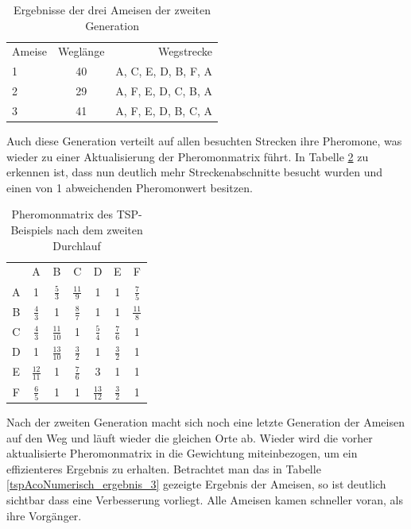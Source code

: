 	\begin{table}
		\centering
		\footnotesize
		\begin{tabular}{l c r}
			Ameise & Weglänge & Wegstrecke \\
			1 & 40 & A, C, E, D, B, F, A\\
			2 & 29 & A, F, E, D, C, B, A\\ 
			3 & 41 & A, F, E, D, B, C, A\\
		\end{tabular}
		\caption{Ergebnisse der drei Ameisen der zweiten Generation}
		\label{tspAcoNumerisch_ergebnis_2}
	\end{table}
	
	Auch diese Generation verteilt auf allen besuchten Strecken ihre Pheromone, was wieder zu einer Aktualisierung der Pheromonmatrix führt. In Tabelle \ref{tspAcoNumerisch_pheromon_2} zu erkennen ist, dass nun deutlich mehr Streckenabschnitte besucht wurden und einen von 1 abweichenden Pheromonwert besitzen.
	
	\begin{table}
		\centering
		\footnotesize
		\begin{tabular}{c c c c c c c}
			& A & B & C & D & E & F \\
			A & 1 & $\frac{5}{3}$ & $\frac{11}{9}$ & 1 & 1 & $\frac{7}{5}$\\ 
			B & $\frac{4}{3}$ & 1 & $\frac{8}{7}$ & 1 & 1 & $\frac{11}{8}$\\ 
			C & $\frac{4}{3}$ & $\frac{11}{10}$ & 1 & $\frac{5}{4}$ & $\frac{7}{6}$ & 1\\
			D & 1 & $\frac{13}{10}$ & $\frac{3}{2}$ & 1 & $\frac{3}{2}$ & 1\\
			E & $\frac{12}{11}$ & 1 & $\frac{7}{6}$ & 3 & 1 & 1\\
			F & $\frac{6}{5}$ & 1 & 1 & $\frac{13}{12}$ & $\frac{3}{2}$ & 1\\
		\end{tabular}
		\caption{Pheromonmatrix des TSP-Beispiels nach dem zweiten Durchlauf}
		\label{tspAcoNumerisch_pheromon_2}
	\end{table}

	Nach der zweiten Generation macht sich noch eine letzte Generation der Ameisen auf den Weg und läuft wieder die gleichen Orte ab. Wieder wird die vorher aktualisierte Pheromonmatrix in die Gewichtung miteinbezogen, um ein effizienteres Ergebnis zu erhalten. Betrachtet man das in Tabelle \ref{tspAcoNumerisch_ergebnis_3} gezeigte Ergebnis der Ameisen, so ist deutlich sichtbar dass eine Verbesserung vorliegt. Alle Ameisen kamen schneller voran, als ihre Vorgänger. 
	
